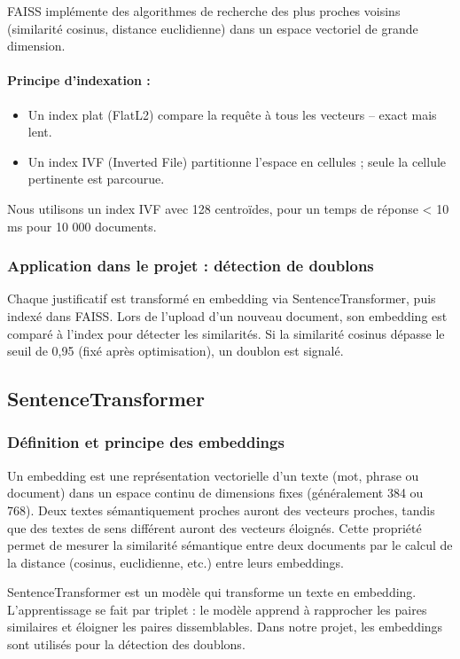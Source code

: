 \documentclass[12pt,a4paper]{report}
\begin{document}
FAISS implémente des algorithmes de recherche des plus proches voisins (similarité cosinus, distance euclidienne) dans un espace vectoriel de grande dimension.  

\paragraph{Principe d’indexation :}
\begin{itemize}
 \item Un index plat (FlatL2) compare la requête à tous les vecteurs – exact mais lent.
 \item Un index IVF (Inverted File) partitionne l’espace en cellules ; seule la cellule pertinente est parcourue.
\end{itemize}
Nous utilisons un index IVF avec 128 centroïdes, pour un temps de réponse < 10 ms pour 10 000 documents.

\subsubsection{Application dans le projet : détection de doublons}

Chaque justificatif est transformé en embedding via SentenceTransformer, puis indexé dans FAISS. Lors de l’upload d’un nouveau document, son embedding est comparé à l’index pour détecter les similarités. Si la similarité cosinus dépasse le seuil de 0,95 (fixé après optimisation), un doublon est signalé.

\subsection{SentenceTransformer}

\subsubsection{Définition et principe des embeddings}

Un embedding est une représentation vectorielle d’un texte (mot, phrase ou document) dans un espace continu de dimensions fixes (généralement 384 ou 768). Deux textes sémantiquement proches auront des vecteurs proches, tandis que des textes de sens différent auront des vecteurs éloignés. Cette propriété permet de mesurer la similarité sémantique entre deux documents par le calcul de la distance (cosinus, euclidienne, etc.) entre leurs embeddings.

SentenceTransformer est un modèle qui transforme un texte en embedding. L’apprentissage se fait par triplet : le modèle apprend à rapprocher les paires similaires et éloigner les paires dissemblables. Dans notre projet, les embeddings sont utilisés pour la détection des doublons.
\end{document}
